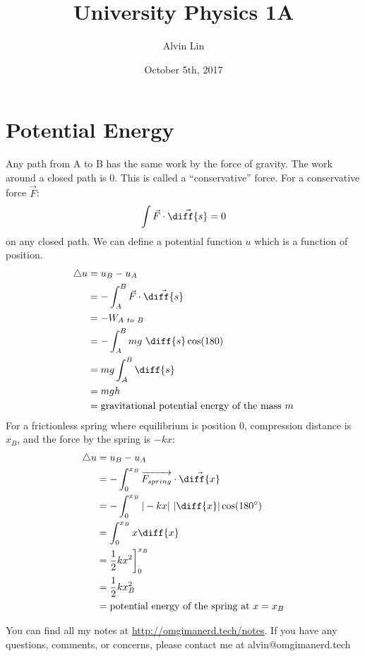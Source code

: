 \documentclass{math}
\title{University Physics 1A}
\author{Alvin Lin}
\date{October 5th, 2017}
\begin{document}
\maketitle

\section*{Potential Energy}
Any path from A to B has the same work by the force of gravity. The work around
a closed path is 0. This is called a ``conservative'' force. For a conservative
force \( \vec{F} \):
\[ \int\vec{F}\cdot\vec{\diff{s}} = 0 \]
on any closed path. We can define a potential function \( u \) which is a
function of position.
\begin{align*}
  \triangle{u} &= u_B-u_A \\
  &= -\int_{A}^{B}\vec{F}\cdot\vec{\diff{s}} \\
  &= -W_{A~to~B} \\
  &= -\int_{A}^{B}mg~\diff{s}\cos(180) \\
  &= mg\int_{A}^{B}\diff{s} \\
  &= mgh \\
  &= \text{gravitational potential energy of the mass } m
\end{align*}
For a frictionless spring where equilibrium is position 0, compression distance
is \( x_B \), and the force by the spring is \( -kx \):
\begin{align*}
  \triangle{u} &= u_B-u_A \\
  &= -\int_{0}^{x_B}\overrightarrow{F_{spring}}\cdot\vec{\diff{x}} \\
  &= -\int_{0}^{x_B}|-kx|~|\diff{x}|\cos(180^{\circ}) \\
  &= \int_{0}^{x_B}x\diff{x} \\
  &= \frac{1}{2}kx^2\bigg]_{0}^{x_B} \\
  &= \frac{1}{2}kx_B^2 \\
  &= \text{potential energy of the spring at }x = x_B
\end{align*}

\begin{center}
  You can find all my notes at \url{http://omgimanerd.tech/notes}. If you have
  any questions, comments, or concerns, please contact me at
  alvin@omgimanerd.tech
\end{center}
\end{document}
